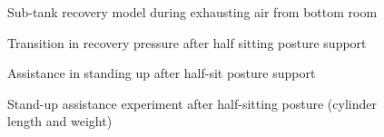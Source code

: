 \begin{figure}[t]%
        \begin{center}%
         \caption{Sub-tank recovery model during exhausting air from bottom room}%
         \vspace{-9mm}
        \end{center}%
\end{figure}%
\begin{figure}[t]%
        \begin{center}%
         \caption{Transition in recovery pressure after half sitting posture support}%
         \vspace{-9mm}
        \end{center}%
\end{figure}%
\begin{figure}[t]%
        \begin{center}%
         \caption{Assistance in standing up after half-sit posture support}%
         \vspace{-10mm}
        \end{center}%
\end{figure}%
\begin{figure}[t]%
        \begin{center}%
         \caption{Stand-up assistance experiment after half-sitting posture (cylinder length and weight)}%
         \vspace{-7mm}
        \end{center}%
\end{figure}%
